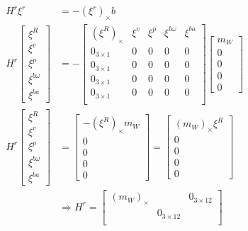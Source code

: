 \begin{equation}
    \begin{split}
        H^r \xi^r &= -(\xi^r)_{\times} b \\
        H^r \begin{bmatrix}
            \xi^R \\
            \xi^v \\
            \xi^p \\
            \xi^{b \omega} \\
            \xi^{b a}
        \end{bmatrix} &= -\begin{bmatrix}
            (\xi^R)_{\times} & \xi^v & \xi^p & \xi^{b \omega} & \xi^{b a} \\
            0_{3 \times 1} & 0 & 0 & 0 & 0 \\
            0_{3 \times 1} & 0 & 0 & 0 & 0 \\
            0_{3 \times 1} & 0 & 0 & 0 & 0 \\
            0_{3 \times 1} & 0 & 0 & 0 & 0 \\
        \end{bmatrix} 
        \begin{bmatrix}
            m_W \\
            0 \\
            0 \\
            0 \\
            0
        \end{bmatrix} \\
        H^r \begin{bmatrix}
            \xi^R \\
            \xi^v \\
            \xi^p \\
            \xi^{b \omega} \\
            \xi^{b a}
        \end{bmatrix} &=  \begin{bmatrix}
            - (\xi^R)_{\times} m_W \\
            0 \\
            0 \\
            0 \\
            0
        \end{bmatrix} 
        = \begin{bmatrix}
            (m_W)_{\times} \xi^R  \\
            0 \\
            0 \\
            0 \\
            0
        \end{bmatrix} \\
        &\Rightarrow H^r = \begin{bmatrix}
        (m_W)_{\times} & & 0_{3 \times 12} \\
        & 0_{3 \times12} &\\
        \end{bmatrix}
    \end{split}
    \label{eq: H^r mag InEKF}
\end{equation}
